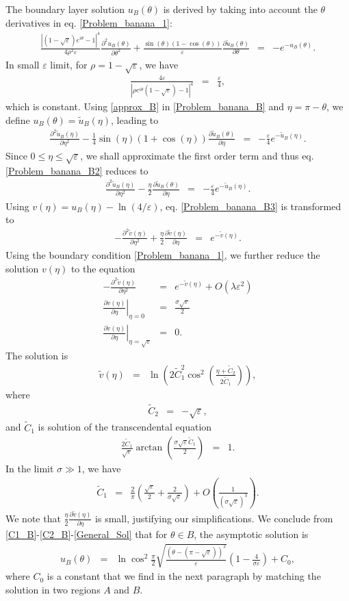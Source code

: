 \documentclass[12pt]{article}
\newcommand{\ds}{\displaystyle}
\newcommand{\beq}{\begin{eqnarray}}
\newcommand{\eeq}{\end{eqnarray}}
\newcommand{\p}{\partial}
\newcommand{\eps}{\varepsilon}
\begin{document}
The boundary layer solution $u_B(\theta)$ is derived  by taking into account the $\theta$ derivatives in eq. \eqref{Problem_banana_1}:
\beq\label{Problem_banana_B}
\frac{|(1-\sqrt{\eps})e^{i\theta}-1|^4}{4\rho^2\eps} \frac{\p^2 u_B(\theta)}{\p \theta^2}
+ \frac{\sin(\theta)(1-\cos(\theta))}{\eps}\frac{\p\tilde u_B(\theta)}{\p\theta}&=&-e^{-\ds u_B(\theta) }.
\eeq
In small $\eps$ limit, for $\rho=1-\sqrt{\eps}$, we have
\beq\label{approx_B}
\frac{ 4\eps}{|\rho e^{i\theta}(1-\sqrt{\eps})-1|^4}&=&\frac{ \eps}{4},
\eeq
which is constant. Using \eqref{approx_B} in \eqref{Problem_banana_B} and $\eta=\pi-\theta$, we define $u_B(\theta)=\tilde u_B(\eta)$, leading to
\beq\label{Problem_banana_B2}
 \frac{\p^2 \tilde u_B(\eta)}{\p \eta^2}
- \frac{1}{4}\sin(\eta)(1+\cos(\eta))\frac{\p\tilde u_B(\theta)}{\p\eta}&=&-\frac{\eps}{4}e^{-\ds \tilde u_B(\eta) }.
\eeq
Since $0\le\eta\le\sqrt{\eps}$, we shall approximate the first order term and thus eq. \eqref{Problem_banana_B2} reduces to
\beq\label{Problem_banana_B3}
\frac{\p^2 \tilde u_B(\eta)}{\p \eta^2}
- \frac{\eta}{2}\frac{\p\tilde u_B(\theta)}{\p\eta}&=& -\frac{\eps}{4}e^{-\ds \tilde u_B(\eta) }.
\eeq
Using $v(\eta)=u_B(\eta)-\ln{\left(\ds4/\eps\right)}$, eq. \eqref{Problem_banana_B3} is transformed to
\beq\label{Problem_banana_B4}
 -\frac{\p^2 \tilde v(\eta)}{\p \eta^2}
+ \frac{\eta}{2}\frac{\p\tilde v(\eta)}{\p\eta}&=&e^{-\ds \tilde v(\eta) }.
\eeq
Using the boundary condition \eqref{Problem_banana_1}, we further reduce the solution $v(\eta)$ to the equation
\beq\label{Problem_banana_B5}
 -\frac{\p^2 \tilde v(\eta)}{\p \eta^2}&=& e^{-\ds \tilde v(\eta) }
+ O(\lambda\eps^2)\\
\left.\frac{\p v(\eta)}{\p\eta}\right|_{\eta=0}&=& \frac{ \sigma\sqrt{\eps}}{2 }\nonumber\\
\left.\frac{\p v(\eta)}{\p\eta}\right|_{\eta=\sqrt{\eps}}&=& 0.\nonumber
\eeq
The solution is
\beq\label{General_Sol2}
  \tilde v(\eta) &=& \ln\left( 2\tilde C_1 ^2\cos^2\left(    \frac{  \eta + \tilde C_2 }{2\tilde C_1 }\right)\right),
\eeq
where
\beq\label{C2_B}
\tilde C_2&=&-\sqrt{\eps},
\eeq
and $\tilde C_1$ is solution of the transcendental equation
\beq
\frac{2\tilde C_1}{\sqrt{\eps}}\arctan\left( \frac{\sigma\sqrt{\eps}\tilde C_1 }{2 }\right)&=&1.
\eeq
In the limit $\sigma\gg 1$, we have
\beq\label{C1_B}
\tilde C_1&=&\frac{2}{\pi }\left( \frac{\sqrt{\eps}}{2} + \frac{2  }{\sigma \sqrt{\eps}}  \right)+O\left(\frac{1}{(\sigma \sqrt{\eps})^3} \right).
\eeq
We note that $\ds\frac{\eta}{2}\frac{\p\tilde v(\eta)}{\p\eta}$ is small, justifying our simplifications.
We conclude from \eqref{C1_B}-\eqref{C2_B}-\eqref{General_Sol} that for $\theta \in B$, the asymptotic solution is
\beq\label{uB}
u_{B}(\theta)&=& \ln\cos^2 \frac{\pi}{2}\sqrt{\frac{(\theta-(\pi-\sqrt{\eps}))^2}{\eps}}
\left(1-\frac{4 }{\sigma\eps} \right) +C_0,
\eeq
where $C_0$ is a constant that we find in the next paragraph by matching the solution in two regions $A$ and $B$.
\end{document}
